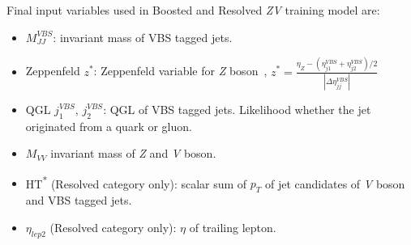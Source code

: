 Final input variables used in Boosted and Resolved \textit{ZV} training model are:
\begin{itemize}
  \item \( M_{JJ}^{VBS} \): invariant mass of \gls{VBS} tagged jets.
  \item Zeppenfeld \( z^{*} \): Zeppenfeld variable for \textit{Z} boson~\cite{Rainwater1996}, \( z^{*} = \frac{\eta_{Z} - (\eta_{j1}^{VBS} + \eta_{j2}^{VBS})/2}{|\Delta \eta_{jj}^{VBS}|} \)
  \item QGL \( j_{1}^{VBS} \), \( j_{2}^{VBS} \): \gls{QGL} of VBS tagged jets. Likelihood whether the jet originated from a quark or gluon.
  \item \( M_{VV} \) invariant mass of \textit{Z} and \textit{V} boson.
  \item HT\textsuperscript{*} (Resolved category only): scalar sum of \(p_T\) of jet candidates
        of \textit{V} boson and \gls{VBS} tagged jets.
  \item \( \eta_{lep2} \) (Resolved category only): \( \eta \) of trailing lepton.
\end{itemize}


